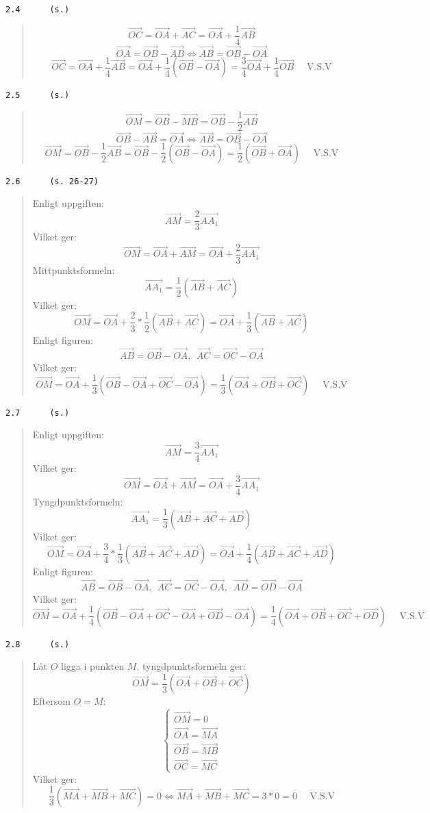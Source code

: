 \documentclass[a4paper]{article}
\newcommand{\tskcol}[1]{\textcolor{tskcol}{#1}}
\newcommand{\vek}[1]{\overrightarrow{#1}}
\begin{document}
\texttt{\tskcol{2.4~~~~~ (s.)}}
\begin{quotation}
	\noindent
	\[\vek{OC}=\vek{OA}+\vek{AC}=\vek{OA}+\frac{1}{4}\vek{AB}\]
	\[\vek{OA}=\vek{OB}-\vek{AB} \Leftrightarrow
	\vek{AB}=\vek{OB}-\vek{OA}\]
	\[\vek{OC}=
	\vek{OA}+\frac{1}{4}\vek{AB}=
	\vek{OA}+\frac{1}{4}(\vek{OB}-\vek{OA})=
	\frac{3}{4}\vek{OA}+\frac{1}{4}\vek{OB} \text{~~~~V.S.V}\]
\end{quotation}

\texttt{\tskcol{2.5~~~~~ (s.)}}
\begin{quotation}
	\noindent
	\[\vek{OM}=\vek{OB}-\vek{MB}=\vek{OB}-\frac{1}{2}\vek{AB}\]
	\[\vek{OB}-\vek{AB}=\vek{OA}\Leftrightarrow
	\vek{AB}=\vek{OB}-\vek{OA}\]
	\[\vek{OM}=
	\vek{OB}-\frac{1}{2}\vek{AB}=
	\vek{OB}-\frac{1}{2}(\vek{OB}-\vek{OA})=
	\frac{1}{2}(\vek{OB}+\vek{OA}) \text{~~~~V.S.V}\]
\end{quotation}

\pagebreak
\texttt{\tskcol{2.6~~~~~ (s. 26-27)}}
\begin{quotation}
	\noindent
	Enligt uppgiften:
	\[\vek{AM}=\frac{2}{3}\vek{AA_1}\]
	Vilket ger:
	\[\vek{OM}=
	\vek{OA}+\vek{AM}=
	\vek{OA}+\frac{2}{3}\vek{AA_1}\]
	Mittpunktsformeln:
	\[\vek{AA_1}=\frac{1}{2}(\vek{AB}+\vek{AC})\]
	Vilket ger:
	\[\vek{OM}=
	\vek{OA}+\frac{2}{3}*\frac{1}{2}(\vek{AB}+\vek{AC})=
	\vek{OA}+\frac{1}{3}(\vek{AB}+\vek{AC})\]
	Enligt figuren:
	\[\vek{AB}=\vek{OB}-\vek{OA},~~
	\vek{AC}=\vek{OC}-\vek{OA}\]
	Vilket ger:
	\[\vek{OM}=
	\vek{OA}+\frac{1}{3}(\vek{OB}-\vek{OA}+\vek{OC}-\vek{OA})=
	\frac{1}{3}(\vek{OA}+\vek{OB}+\vek{OC}) \text{~~~~V.S.V}\]
\end{quotation}

\texttt{\tskcol{2.7~~~~~ (s.)}}
\begin{quotation}
	\noindent
	Enligt uppgiften:
	\[\vek{AM}=\frac{3}{4}\vek{AA_1}\]
	Vilket ger:
	\[\vek{OM}=
	\vek{OA}+\vek{AM}=
	\vek{OA}+\frac{3}{4}\vek{AA_1}\]
	Tyngdpunktsformeln:
	\[\vek{AA_1}=\frac{1}{3}(\vek{AB}+\vek{AC}+\vek{AD})\]
	Vilket ger:
	\[\vek{OM}=
	\vek{OA}+\frac{3}{4}*\frac{1}{3}(\vek{AB}+\vek{AC}+\vek{AD})=
	\vek{OA}+\frac{1}{4}(\vek{AB}+\vek{AC}+\vek{AD})\]
	Enligt figuren:
	\[\vek{AB}=\vek{OB}-\vek{OA},~~
	\vek{AC}=\vek{OC}-\vek{OA},~~
	\vek{AD}=\vek{OD}-\vek{OA}\]
	Vilket ger:
	\[\vek{OM}=
	\vek{OA}+\frac{1}{4}(\vek{OB}-\vek{OA}+\vek{OC}-\vek{OA}+\vek{OD}-\vek{OA})=
	\frac{1}{4}(\vek{OA}+\vek{OB}+\vek{OC}+\vek{OD}) \text{~~~~V.S.V}\]
\end{quotation}

\pagebreak
\texttt{\tskcol{2.8~~~~~ (s.)}}
\begin{quotation}
	\noindent
	Låt $O$ ligga i punkten $M$. tyngdpunktsformeln ger:
	\[\vek{OM}=\frac{1}{3}(\vek{OA}+\vek{OB}+\vek{OC})\]
	Eftersom $O=M$:
	\[\begin{cases}
	\vek{OM}=0 \\
	\vek{OA}=\vek{MA} \\
	\vek{OB}=\vek{MB} \\
	\vek{OC}=\vek{MC}
	\end{cases}\]
	Vilket ger:
	\[\frac{1}{3}(\vek{MA}+\vek{MB}+\vek{MC})=0 \Leftrightarrow
	\vek{MA}+\vek{MB}+\vek{MC}=3*0=0 \text{~~~~V.S.V}\]
\end{quotation}
\end{document}
